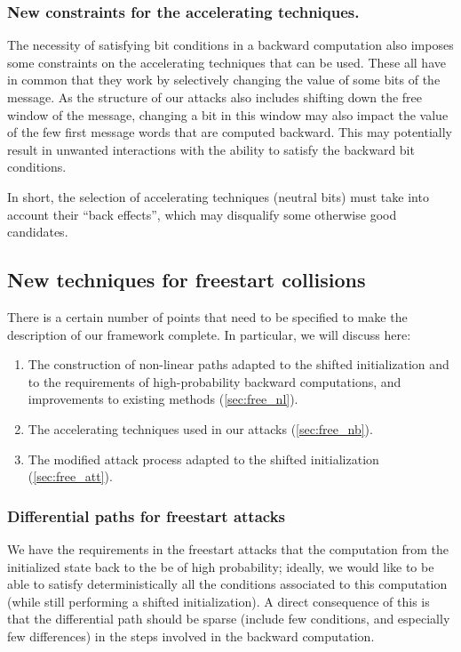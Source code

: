 \subsubsection{New constraints for the accelerating techniques.}
The necessity of satisfying bit conditions in a backward computation also imposes some constraints on the accelerating techniques that can be used. These all have in common that they work by
selectively changing the value of some bits of the message. As the structure of our attacks also includes shifting down the free window of the message, changing a bit in this window may also impact
the value of the few first message words that are computed backward. This may potentially result in unwanted interactions with the ability to satisfy the backward bit conditions.

In short, the selection of accelerating techniques (\eg neutral bits) must take into account their ``back effects'', which may disqualify some otherwise good candidates.

\subsection{New techniques for freestart collisions}
\label{sec:attack_techs}

There is a certain number of points that need to be specified to make the description of our framework complete. In particular, we will discuss here:
\begin{enumerate}
\item The construction of non-linear paths adapted to the shifted initialization and to the requirements of high-probability backward computations, and improvements to existing
methods (\autoref{sec:free_nl}).
\item The accelerating techniques used in our attacks (\autoref{sec:free_nb}).
\item The modified attack process adapted to the shifted initialization (\autoref{sec:free_att}).
\end{enumerate}

\subsubsection{Differential paths for freestart attacks}
\label{sec:free_nl}

We have the requirements in the freestart attacks that the computation from the initialized state back to the \iv be of high probability; ideally, we would like to be able to satisfy deterministically
all the conditions associated to this computation (while still performing a shifted initialization). A direct consequence of this is that the differential path should be sparse (\ie include few
conditions, and especially few differences) in the steps involved in the backward computation.

